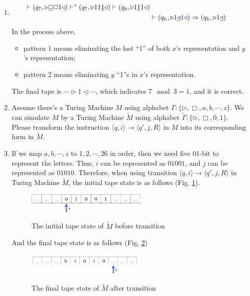 \documentclass[12pt,a4paper]{article}
\makeatletter
\newtheorem*{solution}{Solution}
\theoremstyle{definition}
\renewenvironment{solution}[1][Solution] {\par\pushQED{\qed}\normalfont\topsep6\p@\@plus6\p@\relax\trivlist\item[\hskip\labelsep\bfseries#1\@addpunct{.}]\ignorespaces}{\popQED\endtrivlist\@endpefalse} \makeatother
\makeatother
\begin{document}
\begin{enumerate}
\begin{solution}
\begin{enumerate}
\begin{displaymath}
\begin{aligned}
 \vdash (q_7, \triangleright \underline{\Box} \Box 1 \triangleleft)
 \vdash^* (q_7, \triangleright 1 1 \underline{1} \triangleleft)
 \vdash (q_8, \triangleright 1 \underline{1} 1 \triangleleft) \\
 & \vdash (q_h, \triangleright 1 \underline{\triangleleft} {\color{blue}1 \triangleleft})
 \Rightarrow (q_h, \triangleright 1 \underline{\triangleleft})
\end{aligned}
\end{displaymath}
In the process above,
\begin{itemize}
\item pattern 1 means eliminating the last ``1'' of both $x$'s representation and $y$'s representation;
\item pattern 2 means eliminating $y$ ``1''s in $x$'s representation.
\end{itemize}

The final tape is $\cdots \triangleright 1 \underline{\triangleleft} \cdots$, which indicates $7\mod 3 = 1$, and it is correct.
\end{enumerate}
\end{solution}

\clearpage

\item Assume there's a Turing Machine $M$ using alphabet $\Gamma :\{ \triangleright, \Box, a, b, \cdots, z\}$. We can simulate $M$ by a Turing Machine $\tilde{M}$ using alphabet $\tilde{\Gamma }:\{ \triangleright, \Box, 0, 1\}$. Please transform the instruction $\langle q, i \rangle \rightarrow \langle q',j, R\rangle$ in $M$ into its corresponding form in $\tilde{M}$.
\begin{solution}
If we map $a,b,\cdots,z$ to $1,2,\cdots,26$ in order, then we need five $01$-bit to represent the letters. Thus, $i$ can be represented as $01001$, and $j$ can be represented as $01010$. Therefore, when using transition $\langle q, i \rangle \rightarrow \langle q',j, R\rangle$ in Turing Machine $\tilde{M}$, the initial tape state is as follows (Fig. \ref{fig2}).
\begin{figure}[htbp]
  \centering
  \includegraphics[width=2.3in]{initial-state.png}\\
  \caption{The initial tape state of $\tilde{M}$ before transition}\label{fig2}
\end{figure}

And the final tape state is as follows (Fig. \ref{fig3})
\begin{figure}[htbp]
  \centering
  \includegraphics[width=2.3in]{final-state.png}\\
  \caption{The final tape state of $\tilde{M}$ after transition}\label{fig3}
\end{figure}


\end{solution}
\end{enumerate}
\end{document}
